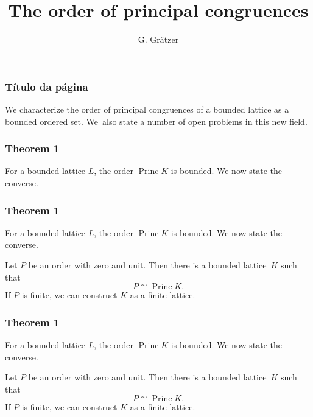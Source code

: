\documentclass[leqno]{beamer}
\DeclareMathOperator{\Princ}{Princ}
\begin{document}
\title[Título reduzido]{The order of principal congruences}
\author{G. Gr\"atzer}
\date{\the\year}
\maketitle

\begin{frame}
    \frametitle{Título da página}
    We characterize the order of principal congruences
    of a bounded lattice
    as a bounded ordered set.
    We~also state a number of open problems in this new field.
    \medskip
\end{frame}

\begin{frame}
    \frametitle{Theorem 1}
    For a bounded lattice $L$, the order $\Princ K$ is bounded.
    We now state the converse.
\end{frame}

\begin{frame}
    \frametitle{Theorem 1}
    For a bounded lattice $L$, the order $\Princ K$ is bounded.
    We now state the converse.
    \begin{theorem}
    Let $P$ be an order with zero and unit.
    Then there is a bounded lattice~$K$ such that
    \[
    P \cong \Princ K.
    \]
    If $P$ is finite, we can construct $K$ as a finite lattice.
    \end{theorem}
\end{frame}

\begin{frame}
    \frametitle{Theorem 1}
    For a bounded lattice $L$, the order $\Princ K$ is bounded.
    We now state the converse.
    \pause %
    \begin{theorem}
        Let $P$ be an order with zero and unit.
        Then there is a bounded lattice~$K$ such that
        \[
        P \cong \Princ K.
        \]
        If $P$ is finite, we can construct $K$ as a finite lattice.
    \end{theorem}
\end{frame}
\end{document}
